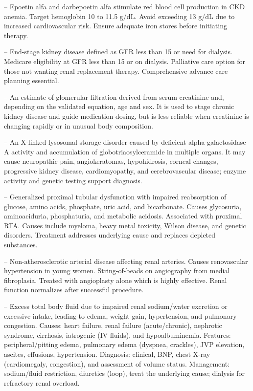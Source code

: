 -- Epoetin alfa and darbepoetin alfa stimulate red blood cell production in CKD anemia. Target hemoglobin 10 to 11.5 g/dL. Avoid exceeding 13 g/dL due to increased cardiovascular risk. Ensure adequate iron stores before initiating therapy.

-- End-stage kidney disease defined as GFR less than 15 or need for dialysis. Medicare eligibility at GFR less than 15 or on dialysis. Palliative care option for those not wanting renal replacement therapy. Comprehensive advance care planning essential.

-- An estimate of glomerular filtration derived from serum creatinine and, depending on the validated equation, age and sex. It is used to stage chronic kidney disease and guide medication dosing, but is less reliable when creatinine is changing rapidly or in unusual body composition.

-- An X-linked lysosomal storage disorder caused by deficient alpha-galactosidase A activity and accumulation of globotriaosylceramide in multiple organs. It may cause neuropathic pain, angiokeratomas, hypohidrosis, corneal changes, progressive kidney disease, cardiomyopathy, and cerebrovascular disease; enzyme activity and genetic testing support diagnosis.

-- Generalized proximal tubular dysfunction with impaired reabsorption of glucose, amino acids, phosphate, uric acid, and bicarbonate. Causes glycosuria, aminoaciduria, phosphaturia, and metabolic acidosis. Associated with proximal RTA. Causes include myeloma, heavy metal toxicity, Wilson disease, and genetic disorders. Treatment addresses underlying cause and replaces depleted substances.

-- Non-atherosclerotic arterial disease affecting renal arteries. Causes renovascular hypertension in young women. String-of-beads on angiography from medial fibroplasia. Treated with angioplasty alone which is highly effective. Renal function normalizes after successful procedure.

-- Excess total body fluid due to impaired renal sodium/water excretion or excessive intake, leading to edema, weight gain, hypertension, and pulmonary congestion. Causes: heart failure, renal failure (acute/chronic), nephrotic syndrome, cirrhosis, iatrogenic (IV fluids), and hypoalbuminemia. Features: peripheral/pitting edema, pulmonary edema (dyspnea, crackles), JVP elevation, ascites, effusions, hypertension. Diagnosis: clinical, BNP, chest X-ray (cardiomegaly, congestion), and assessment of volume status. Management: sodium/fluid restriction, diuretics (loop), treat the underlying cause; dialysis for refractory renal overload.

